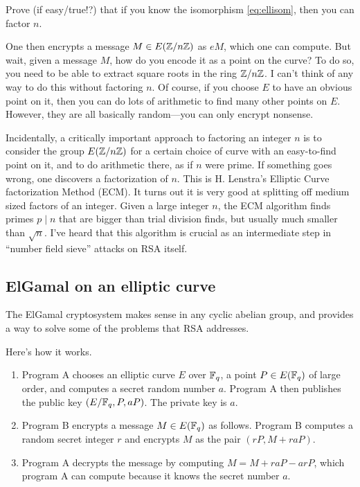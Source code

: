 \documentclass{book}
\begin{document}
\begin{exercise}
Prove (if easy/true!?) that if you know
the isomorphism \eqref{eq:ellisom}, then you
can factor $n$.
\end{exercise}

One then encrypts a message $M\in E(\mathbb{Z}/n\mathbb{Z})$
as $e M$, which one can compute.
But wait, given a message $M$, how do you encode
it as a point on the curve?  To do so, you need to be
able to extract square roots in the ring $\mathbb{Z}/n\mathbb{Z}$.
I can't think of any way to do this without factoring $n$.
Of course, if you choose $E$ to have an obvious point
on it, then you can do lots of arithmetic to find many
other points on $E$.  However, they are all basically random---you
can only encrypt nonsense.

Incidentally, a critically important approach to
factoring an integer $n$ is to consider the
group $E(\mathbb{Z}/n\mathbb{Z})$ for a certain choice of curve
with an easy-to-find point on it, and to do arithmetic
there, as if $n$ were prime.  If something goes wrong,
one discovers a factorization of $n$.  This is
H. Lenstra's Elliptic Curve factorization Method (ECM).
It turns out it is very good at splitting off medium
sized factors of an integer.  Given a large integer
$n$, the ECM algorithm finds primes $p\mid n$ that
are bigger than trial division finds, but usually much
smaller than $\sqrt{n}$.   I've heard that this algorithm
is crucial as an intermediate step in ``number field
sieve'' attacks on RSA itself.

\subsection{ElGamal on an elliptic curve}

The ElGamal cryptosystem makes sense in any cyclic abelian group,
and provides a way to solve some of the problems that RSA addresses.

Here's how it works.
\begin{enumerate}
\item Program A chooses an elliptic curve $E$ over $\mathbb{F}_q$, a point
$P\in E(\mathbb{F}_q)$ of large order, and computes a secret random number $a$.   Program
A then publishes the public key $(E/\mathbb{F}_q, P, aP)$.  The private key is $a$.
\item Program B encrypts a message $M \in E(\mathbb{F}_q)$ as follows.  Program B
computes a random secret integer $r$ and encrypts $M$ as the pair
$(rP,M + raP)$.
\item Program A decrypts the message by computing
$M = M + raP - arP$, which program A can compute because
it knows the secret number $a$.
\end{enumerate}
\end{document}
